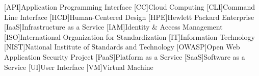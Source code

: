 \begin{acronym}[TTTTTTTT]
	[API]{Application Programming Interface}
	[CC]{Cloud Computing}
	[CLI]{Command Line Interface}
	[HCD]{Human-Centered Design}
	[HPE]{Hewlett Packard Enterprise}
	[IaaS]{Infrastructure as a Service}
	[IAM]{Identity \& Access Management}
	[ISO]{International Organization for Standardization}
	[IT]{Information Technology}
	[NIST]{National Institute of Standards and Technology}
	[OWASP]{Open Web Application Security Project}
	[PaaS]{Platform as a Service}
	[SaaS]{Software as a Service}
	[UI]{User Interface}
	[VM]{Virtual Machine}
\end{acronym}
